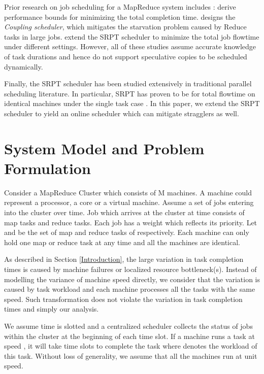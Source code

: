 \documentclass[10pt,conference,compsocconf,letterpaper]{IEEEtran}
\begin{document}
Prior research on job scheduling for a MapReduce system includes \cite{Fast_completion,Flow_Shops,Joint_Phase,Delay_Tails,Joing_scheduling,overlapping_phases,Schedulers}:\cite{Fast_completion,Joing_scheduling,Joint_Phase}
derive performance bounds for minimizing the total completion time. \cite{Delay_Tails} designs the \textit{Coupling scheduler}, which mitigates the starvation problem caused by Reduce tasks in large jobs. \cite{Flow_Shops,Schedulers,Joing_scheduling} extend the SRPT scheduler to minimize the total job flowtime under different settings. However, all of these studies assume accurate knowledge of task durations and hence do not support speculative copies to be scheduled dynamically.

Finally, the SRPT scheduler has been studied extensively in traditional parallel scheduling literature.
In particular, SRPT has proven to be   for total flowtime on  identical machines under the single task case \cite{SRPT}.
In this paper, we extend the SRPT scheduler to yield an online scheduler which can mitigate stragglers as well.


\section{System Model and Problem Formulation}
\label{system_model}
Consider a MapReduce Cluster which consists of M machines. A machine could represent a processor, a core or a virtual machine. Assume a set of jobs   entering into the cluster over time. Job  which arrives at the cluster at time  consists of  map tasks and  reduce tasks. Each job has a weight  which reflects its priority. Let  and  be the set of map and reduce tasks of  respectively. Each machine can only hold one map or reduce task at any time and all the machines are identical.

As described in Section \ref{Introduction}, the large variation in task completion times is caused by machine failures or localized resource bottleneck(s). Instead of modelling the variance of machine speed directly, we consider that the variation is caused by task workload and each machine processes all the tasks with the same speed. Such transformation does not violate the variation in task completion times and simply our analysis.

We assume time is slotted and a centralized scheduler collects the status of jobs within the cluster at the beginning of each time slot. If a machine runs a task at speed , it will take  time slots to complete the task where  denotes the workload of this task.
 Without loss of generality, we assume that  all the machines run at unit speed.
\end{document}
